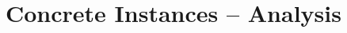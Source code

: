 \documentclass[11pt,oneside,openany]{book}
\begin{document}
\frontmatter
\mainmatter
\part{Concrete Instances -- Analysis}

\end{document}
